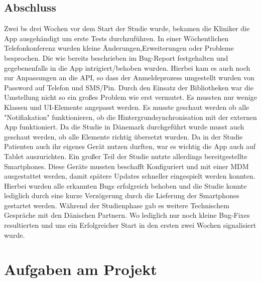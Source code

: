 \subsection{Abschluss}
Zwei bs drei Wochen vor dem Start der Studie wurde, bekamen die Kliniker die App ausgehändigt um erste Tests durchzuführen. In einer Wöchentlichen Telefonkonferenz wurden kleine Änderungen,Erweiterungen oder  Probleme besprochen. Die wie bereits beschrieben im Bug-Report festgehalten  und gegebenenfalls in die App intrigiert/behoben wurden. Hierbei kam es auch noch zur Anpassungen an die API, so dass der Anmeldeprozess umgestellt wurden von Password auf Telefon und SMS/Pin. Durch den Einsatz der Bibliotheken war die Umstellung nicht so ein großes Problem wie erst vermutet. Es mussten nur wenige Klassen und UI-Elemente angepasst werden. Es musste geschaut werden ob alle "Notifiakation" funktionieren, ob die Hintergrundsynchronisation mit der externen App funktioniert. Da die Studie in Dänemark durchgeführt wurde musst auch geschaut werden, ob alle Elemente richtig übersetzt wurden. Da in der Studie Patienten auch ihr eigenes Gerät nutzen durften, war es wichtig die App auch auf Tablet auszurichten. Ein großer Teil der Studie nutzte allerdings bereitgestellte Smartphones. Diese Geräte mussten beschafft Konfiguriert und mit einer MDM%
ausgestattet werden, damit spätere Updates schneller eingespielt werden konnten. Hierbei wurden alle erkannten Bugs erfolgreich behoben und die Studie konnte lediglich durch eine kurze Verzögerung durch die Lieferung der Smartphones gestartet werden. Während der Studienphase gab es weitere Technischem Gespräche mit den Dänischen Partnern. Wo lediglich nur noch kleine Bug-Fixes resultierten und uns ein Erfolgreicher Start in den ersten zwei Wochen signalisiert wurde. 

\section{Aufgaben am Projekt}






